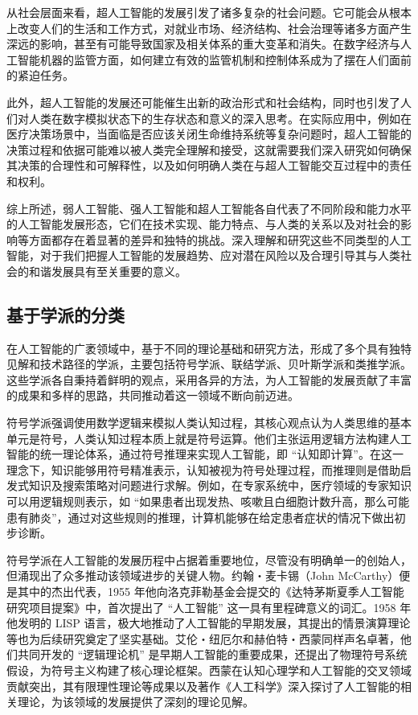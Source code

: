 从社会层面来看，超人工智能的发展引发了诸多复杂的社会问题。它可能会从根本上改变人们的生活和工作方式，对就业市场、经济结构、社会治理等诸多方面产生深远的影响，甚至有可能导致国家及相关体系的重大变革和消失。在数字经济与人工智能机器的监管方面，如何建立有效的监管机制和控制体系成为了摆在人们面前的紧迫任务。


此外，超人工智能的发展还可能催生出新的政治形式和社会结构，同时也引发了人们对人类在数字模拟状态下的生存状态和意义的深入思考。在实际应用中，例如在医疗决策场景中，当面临是否应该关闭生命维持系统等复杂问题时，超人工智能的决策过程和依据可能难以被人类完全理解和接受，这就需要我们深入研究如何确保其决策的合理性和可解释性，以及如何明确人类在与超人工智能交互过程中的责任和权利。


综上所述，弱人工智能、强人工智能和超人工智能各自代表了不同阶段和能力水平的人工智能发展形态，它们在技术实现、能力特点、与人类的关系以及对社会的影响等方面都存在着显著的差异和独特的挑战。深入理解和研究这些不同类型的人工智能，对于我们把握人工智能的发展趋势、应对潜在风险以及合理引导其与人类社会的和谐发展具有至关重要的意义。


\subsection{基于学派的分类}
在人工智能的广袤领域中，基于不同的理论基础和研究方法，形成了多个具有独特见解和技术路径的学派，主要包括符号学派、联结学派、贝叶斯学派和类推学派。这些学派各自秉持着鲜明的观点，采用各异的方法，为人工智能的发展贡献了丰富的成果和多样的思路，共同推动着这一领域不断向前迈进。


符号学派强调使用数学逻辑来模拟人类认知过程，其核心观点认为人类思维的基本单元是符号，人类认知过程本质上就是符号运算。他们主张运用逻辑方法构建人工智能的统一理论体系，通过符号推理来实现人工智能，即 “认知即计算”。在这一理念下，知识能够用符号精准表示，认知被视为符号处理过程，而推理则是借助启发式知识及搜索策略对问题进行求解。例如，在专家系统中，医疗领域的专家知识可以用逻辑规则表示，如 “如果患者出现发热、咳嗽且白细胞计数升高，那么可能患有肺炎”，通过对这些规则的推理，计算机能够在给定患者症状的情况下做出初步诊断。


符号学派在人工智能的发展历程中占据着重要地位，尽管没有明确单一的创始人，但涌现出了众多推动该领域进步的关键人物。约翰・麦卡锡（John McCarthy）便是其中的杰出代表，1955 年他向洛克菲勒基金会提交的《达特茅斯夏季人工智能研究项目提案》中，首次提出了 “人工智能” 这一具有里程碑意义的词汇。1958 年他发明的 LISP 语言，极大地推动了人工智能的早期发展，其提出的情景演算理论等也为后续研究奠定了坚实基础。艾伦・纽厄尔和赫伯特・西蒙同样声名卓著，他们共同开发的 “逻辑理论机” 是早期人工智能的重要成果，还提出了物理符号系统假设，为符号主义构建了核心理论框架。西蒙在认知心理学和人工智能的交叉领域贡献突出，其有限理性理论等成果以及著作《人工科学》深入探讨了人工智能的相关理论，为该领域的发展提供了深刻的理论见解。


